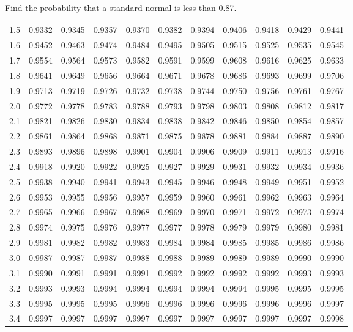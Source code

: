 \begin{frame}{\small Find the probability that a standard normal is less than 0.87.}
{\begin{tabular}{l|llllllllll}
1.5 & 0.9332 & 0.9345 & 0.9357 & 0.9370 & 0.9382 & 0.9394 & 0.9406 & 0.9418 & 0.9429 & 0.9441 \\ 
1.6 & 0.9452 & 0.9463 & 0.9474 & 0.9484 & 0.9495 & 0.9505 & 0.9515 & 0.9525 & 0.9535 & 0.9545 \\ 
1.7 & 0.9554 & 0.9564 & 0.9573 & 0.9582 & 0.9591 & 0.9599 & 0.9608 & 0.9616 & 0.9625 & 0.9633 \\ 
1.8 & 0.9641 & 0.9649 & 0.9656 & 0.9664 & 0.9671 & 0.9678 & 0.9686 & 0.9693 & 0.9699 & 0.9706 \\ 
1.9 & 0.9713 & 0.9719 & 0.9726 & 0.9732 & 0.9738 & 0.9744 & 0.9750 & 0.9756 & 0.9761 & 0.9767 \\ 
2.0 & 0.9772 & 0.9778 & 0.9783 & 0.9788 & 0.9793 & 0.9798 & 0.9803 & 0.9808 & 0.9812 & 0.9817 \\ 
2.1 & 0.9821 & 0.9826 & 0.9830 & 0.9834 & 0.9838 & 0.9842 & 0.9846 & 0.9850 & 0.9854 & 0.9857 \\ 
2.2 & 0.9861 & 0.9864 & 0.9868 & 0.9871 & 0.9875 & 0.9878 & 0.9881 & 0.9884 & 0.9887 & 0.9890 \\ 
2.3 & 0.9893 & 0.9896 & 0.9898 & 0.9901 & 0.9904 & 0.9906 & 0.9909 & 0.9911 & 0.9913 & 0.9916 \\ 
2.4 & 0.9918 & 0.9920 & 0.9922 & 0.9925 & 0.9927 & 0.9929 & 0.9931 & 0.9932 & 0.9934 & 0.9936 \\ 
2.5 & 0.9938 & 0.9940 & 0.9941 & 0.9943 & 0.9945 & 0.9946 & 0.9948 & 0.9949 & 0.9951 & 0.9952 \\ 
2.6 & 0.9953 & 0.9955 & 0.9956 & 0.9957 & 0.9959 & 0.9960 & 0.9961 & 0.9962 & 0.9963 & 0.9964 \\ 
2.7 & 0.9965 & 0.9966 & 0.9967 & 0.9968 & 0.9969 & 0.9970 & 0.9971 & 0.9972 & 0.9973 & 0.9974 \\ 
2.8 & 0.9974 & 0.9975 & 0.9976 & 0.9977 & 0.9977 & 0.9978 & 0.9979 & 0.9979 & 0.9980 & 0.9981 \\ 
2.9 & 0.9981 & 0.9982 & 0.9982 & 0.9983 & 0.9984 & 0.9984 & 0.9985 & 0.9985 & 0.9986 & 0.9986 \\ 
3.0 & 0.9987 & 0.9987 & 0.9987 & 0.9988 & 0.9988 & 0.9989 & 0.9989 & 0.9989 & 0.9990 & 0.9990 \\ 
3.1 & 0.9990 & 0.9991 & 0.9991 & 0.9991 & 0.9992 & 0.9992 & 0.9992 & 0.9992 & 0.9993 & 0.9993 \\ 
3.2 & 0.9993 & 0.9993 & 0.9994 & 0.9994 & 0.9994 & 0.9994 & 0.9994 & 0.9995 & 0.9995 & 0.9995 \\ 
3.3 & 0.9995 & 0.9995 & 0.9995 & 0.9996 & 0.9996 & 0.9996 & 0.9996 & 0.9996 & 0.9996 & 0.9997 \\ 
3.4 & 0.9997 & 0.9997 & 0.9997 & 0.9997 & 0.9997 & 0.9997 & 0.9997 & 0.9997 & 0.9997 & 0.9998 
\end{tabular}


}


\end{frame}

